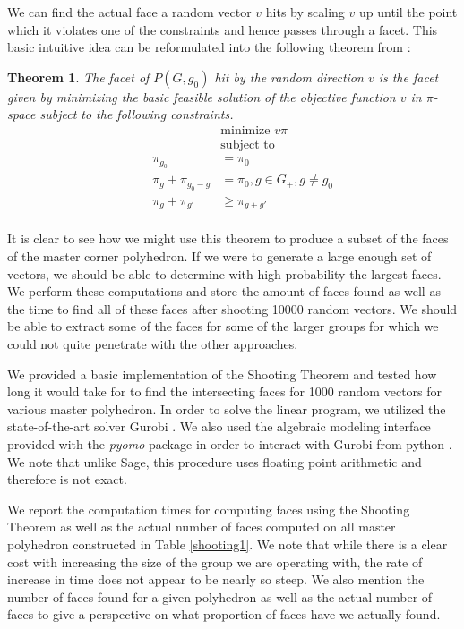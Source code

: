 \documentclass{article}
\newtheorem{theorem}{Theorem}
\begin{document}
	We can find the actual face a random vector $v$ hits by scaling $v$ up until the point which it violates one of the constraints and hence passes through a facet. This basic intuitive idea can be reformulated into the following theorem from \cite{gomory2003corner}:
	\begin{theorem}
		The facet of $P(G, g_0)$ hit by the random direction $v$ is the facet given by minimizing the basic feasible solution of the objective function $v$ in $\pi$-space subject to the following constraints.
		\begin{equation*}
		\begin{aligned}
		& & & \text{minimize } v\pi \\
		& & & \text{subject to} \\
		& &  \pi_{g_0} &= \pi_0 \\
		& &  \pi_g + \pi_{g_0 - g} &= \pi_0, g \in G_+, g \ne g_0\\
		& &  \pi_g + \pi_{g'} &\ge \pi_{g + g'} \\
		\end{aligned}
		\end{equation*}
	\end{theorem}

	It is clear to see how we might use this theorem to produce a subset of the faces of the master corner polyhedron. If we were to generate a large enough set of vectors, we should be able to determine with high probability the largest faces. We perform these computations and store the amount of faces found as well as the time to find all of these faces after shooting 10000 random vectors. We should be able to extract some of the faces for some of the larger groups for which we could not quite penetrate with the other approaches.
	
	We provided a basic implementation of the Shooting Theorem and tested how long it would take for to find the intersecting faces for 1000 random vectors for various master polyhedron. In order to solve the linear program, we utilized the state-of-the-art solver Gurobi \cite{gurobi}. We also used the algebraic modeling interface provided with the \textit{pyomo} package in order to interact with Gurobi from python \cite{hart2011pyomo}. We note that unlike Sage, this procedure uses floating point arithmetic and therefore is not exact.
	
	We report the computation times for computing faces using the Shooting Theorem as well as the actual number of faces computed on all master polyhedron constructed in Table \ref{shooting1}. We note that while there is a clear cost with increasing the size of the group we are operating with, the rate of increase in time does not appear to be nearly so steep. We also mention the number of faces found for a given polyhedron as well as the actual number of faces to give a perspective on what proportion of faces have we actually found.
	
\end{document}
